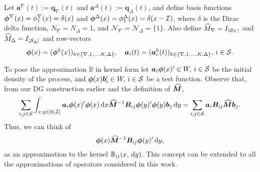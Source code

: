 Let \(\boldsymbol a^\nabla(t):=\boldsymbol q_\nabla(t)\) and \(\boldsymbol a^\Delta(t):=\boldsymbol q_\Delta(t)\), and define basis functions \(\boldsymbol\phi^\nabla(x) = \phi^\nabla_1(x) = \delta(x)\) and \(\boldsymbol\phi^\Delta(x) = \phi^\Delta_1(x) = \delta(x-\mathcal I)\), where \(\delta\) is the Dirac delta function, \(N_\nabla = N_\Delta = 1\), and \(\mathcal N_\nabla = \mathcal N_\Delta = \{1\}\). Also define \(\widehat M_\nabla=I_{|\mathcal{S}_\nabla|}\) and \(\widehat M_\Delta=I_{|\mathcal{S}_\Delta|}\) and row-vectors 
\[\boldsymbol \phi(x) = (\boldsymbol\phi^k(x))_{k\in\{\nabla,1,...,K,\Delta\}}, \quad \boldsymbol a_i(t) = (\boldsymbol a_{i}^k(t))_{k\in\{\nabla,1,...,K,\Delta\}},\,i\in\mathcal{S}.\]

To pose the approximation \(\mathbb B\) in kernel form let \(\boldsymbol a_i \boldsymbol \phi(x)'{}\in W,\,i\in\mathcal{S}\) be the initial density of the process, and \(\boldsymbol \phi(x)\boldsymbol b_i'{}\in W,\,i\in\mathcal{S}\) be a test function. Observe that, from our DG construction earlier and the definition of \(\widehat{\boldsymbol M}\), 
\[\sum_{i,j\in\mathcal{S}}\int_{x,y\in[0,\mathcal I]} \boldsymbol a_i \boldsymbol \phi(x)'{} \boldsymbol \phi (x) \, \mathrm{d} x \widehat{\boldsymbol M}^{-1}{  \boldsymbol B}_{ij} \boldsymbol \phi(y)'{} \boldsymbol \phi(y)\boldsymbol b_j \, \mathrm{d} y= \sum_{i,j\in\mathcal{S}} \boldsymbol a_i {  \boldsymbol B}_{ij} \widehat{\boldsymbol M} \boldsymbol b_j .\]
Thus, we can think of 
\[\boldsymbol \phi (x) \widehat{\boldsymbol M}^{-1}{  \boldsymbol B}_{ij} \boldsymbol \phi(y)'{}\, \mathrm{d} y,\]
as an approximation to the kernel \(\mathbb B_{ij}(x,\, \mathrm{d} y)\). This concept can be extended to all the approximations of operators considered in this work. 

